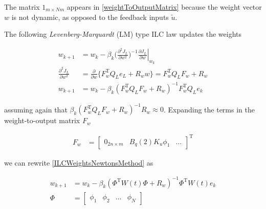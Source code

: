 \documentclass[10pt,a4paper]{article}
\newcommand\at[2]{\left.#1\right|_{#2}} %
\newcommand{\joint}{q} %
\newcommand{\error}{e} %
\newcommand{\sysInput}{u} %
\newcommand{\linInput}{\tilde{u}} %
\newcommand{\weights}{w} %
\newcommand{\basis}{\phi} %
\newcommand{\ValueFunction}{J}
\begin{document}
The matrix $1_{m\times Nm}$ appears in \eqref{weightToOutputMatrix} because the weight vector $\weights$ is not dynamic, as opposed to the feedback inputs $\linInput$.


The following \emph{Levenberg-Marquardt} (LM) type ILC law updates the weights

\begin{equation}
\begin{aligned}
\weights_{k+1} &= \weights_k - \beta_k\Big(\frac{\partial^{2}\ValueFunction_L}{\partial\weights^{2}}\Big)^{-1}\at{\frac{\partial{\ValueFunction_L}}{\partial{\weights}}}{\weights_k} \\
\frac{\partial^{2}\ValueFunction_L}{\partial\weights^{2}} &= \frac{\partial}{\partial\weights}\{F_{\weights}^{\mathrm{T}}Q_L\error_L + R_{\weights}\weights\} = F_{\weights}^{\mathrm{T}}Q_LF_{\weights} + R_{\weights} \\
\weights_{k+1} &= \weights_k - \beta_k(F_{\weights}^{\mathrm{T}}Q_LF_{\weights} + R_{\weights})^{-1}F_{\weights}^{\mathrm{T}}Q_L\error_k
\end{aligned}
\label{ILCWeightsNewtonsMethod}
\end{equation}

assuming again that $\beta_k(F_{\weights}^{\mathrm{T}}Q_LF_{\weights} + R_{\weights})^{-1}R_{\weights} \approx 0$. Expanding the terms in the weight-to-output matrix $F_{\weights}$

\begin{equation}
\begin{aligned}
F_{\weights} &= \begin{bmatrix}
  0_{2n \times m} & B_{\joint}(2)K_{\sysInput}\basis_{1} & \ldots
 \end{bmatrix}^{\mathrm{T}}
\end{aligned}
\label{weightToOutputMatrixExpanded}
\end{equation}

we can rewrite \eqref{ILCWeightsNewtonsMethod} as

\begin{equation}
\begin{aligned}
\weights_{k+1} &= \weights_k - \beta_k(\Phi^{\mathrm{T}}W(t)\Phi + R_{\weights})^{-1}\Phi^{\mathrm{T}}W(t)\error_k \\
\Phi &= \begin{bmatrix}
  \basis_1 & \basis_2 & \ldots & \basis_N
 \end{bmatrix}
\end{aligned}
\label{ILCWeightedRidgeRegression}
\end{equation}
\end{document}
